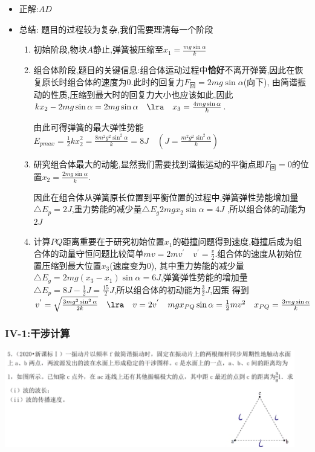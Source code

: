 \documentclass{article}
\begin{document}
\begin{itemize}
    \item 正解:$AD$
    \item 总结:
          题目的过程较为复杂,我们需要理清每一个阶段
          \begin{enumerate}
              \item 初始阶段,物块$A$静止,弹簧被压缩至$x_{1} = \frac{mg\sin{\alpha}}{k}$
              \item 组合体阶段,题目的关键信息:组合体运动过程中\textbf{恰好}不离开弹簧,因此在恢复原长时组合体的速度为$0$.此时的回复力$F_{\text{回}} = 2mg\sin{\alpha}$(向下),
                    由简谐振动的性质,压缩到最大时的回复力大小也应该如此,因此$kx_{2} - 2mg\sin{\alpha} = 2mg\sin{\alpha} \quad \lra \quad x_{3} = \frac{4mg\sin{\alpha}}{k}$.

                    由此可得弹簧的最大弹性势能$ E_{pmax} = \frac{1}{2}kx_{2}^{2} = \frac{8m^{2}g^{2}\sin^{2}{\alpha}}{k} = 8J \quad (J = \frac{m^{2}g^{2}\sin^{2}{\alpha}}{k} )$

              \item 研究组合体最大的动能,显然我们需要找到谐振运动的平衡点即$F_{\text{回}} = 0$的位置$x_{2} = \frac{2mg\sin{\alpha}}{k} $.

                    因此在组合体从弹簧原长位置到平衡位置的过程中,弹簧弹性势能增加量$ \triangle E_{p} = 2J $,重力势能的减少量$ \triangle E_{g}2mgx_{2}\sin{\alpha} = 4J $ ,所以组合体的动能为$2J$

              \item 计算$PQ$距离重要在于研究初始位置$x_{1}$的碰撞问题得到速度,碰撞后成为组合体的动量守恒问题比较简单$ mv = 2mv^{'} \quad v^{'} = \frac{v}{2} $.组合体的速度从初始位置压缩到最大位置$x_{3}$(速度变为$0$),
                    其中重力势能的减少量$ \triangle E_{g} = 2mg(x_{3} - x_{1})\sin{\alpha} = 6J$,弹簧弹性势能的增加量$ \triangle E_{p} = 8J - \frac{1}{2}J  = \frac{15}{2}J$,所以组合体的初动能为$\frac{3}{2}J$,因策
                    得到$v^{'} = \sqrt{\frac{3mg^{2}\sin^{2}{\alpha}}{2k}} \quad \lra \quad v = 2 v^{'} \quad mgx_{PQ}\sin{\alpha} = \frac{1}{2}mv^{2} \quad x_{PQ} = \frac{3mg\sin{\alpha}}{k} $
          \end{enumerate}
\end{itemize}


\vspace{2em}

\subsubsection{IV-1:干涉计算}
\includegraphics[width = 0.95\textwidth]{./pictures/2.1-4.png}
\end{document}
